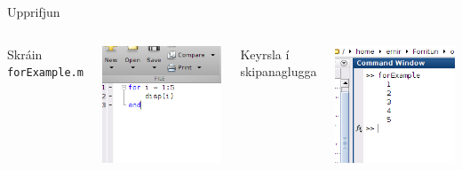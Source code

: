 \documentclass{beamer}
\begin{document}
\begin{frame}{Upprifjun}
\vspace{\baselineskip}
\begin{columns}
Skráin \texttt{forExample.m}
\begin{center}
\includegraphics[width=0.8\linewidth]{Pics/for-example}
\end{center}
Keyrsla í skipanaglugga
\begin{center}
\includegraphics[width=0.8\linewidth]{Pics/for-example-run}
\end{center}
\end{columns}
\end{frame}
\end{document}
